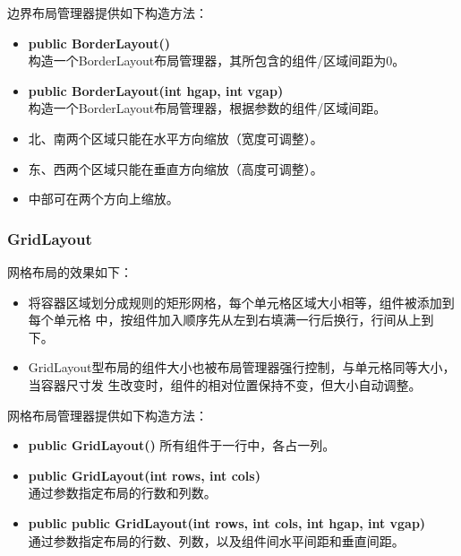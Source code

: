 边界布局管理器提供如下构造方法：
  
\begin{itemize}\kai
\item {\bf public BorderLayout()}\\
  构造一个BorderLayout布局管理器，其所包含的组件/区域间距为0。
\item {\bf public BorderLayout(int hgap, int vgap)}\\
  构造一个BorderLayout布局管理器，根据参数的组件/区域间距。
\end{itemize}


\begin{itemize}\kai
\item 北、南两个区域只能在水平方向缩放（宽度可调整）。
\item 东、西两个区域只能在垂直方向缩放（高度可调整）。
\item 中部可在两个方向上缩放。
\end{itemize}

\subsubsection{GridLayout}

网格布局的效果如下：

\begin{itemize}
\item 将容器区域划分成规则的矩形网格，每个单元格区域大小相等，组件被添加到每个单元格
  中，按组件加入顺序先从左到右填满一行后换行，行间从上到下。
\item GridLayout型布局的组件大小也被布局管理器强行控制，与单元格同等大小，当容器尺寸发
  生改变时，组件的相对位置保持不变，但大小自动调整。
\end{itemize}

网格布局管理器提供如下构造方法：

\begin{itemize}\kai
\item {\bf public GridLayout()}  所有组件于一行中，各占一列。
\item {\bf public GridLayout(int rows, int cols)}\\
  通过参数指定布局的行数和列数。
\item {\bf public public GridLayout(int rows, int cols, int hgap, int vgap)}\\
  通过参数指定布局的行数、列数，以及组件间水平间距和垂直间距。
\end{itemize}

